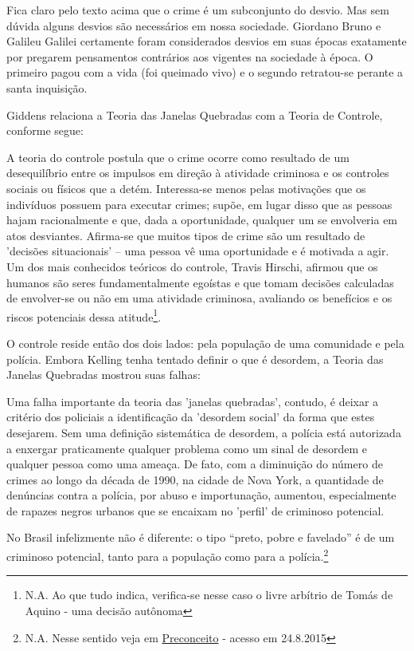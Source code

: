\documentclass[
	12pt,				%
	openright,			%
	twoside,			%
	a4paper,			%
	chapter=TITLE,		%
	section=TITLE,		%
	subsection=TITLE,	%
	subsubsection=TITLE,%
	spanish,            %
	english,			%
	brazil				%
	]{abntex2}
\begin{document}
\par
Fica claro pelo texto acima que o crime é um subconjunto do desvio. Mas sem dúvida alguns desvios são necessários em nossa sociedade. Giordano Bruno e Galileu Galilei certamente foram considerados desvios em suas épocas exatamente por pregarem pensamentos contrários aos vigentes na sociedade à época. O primeiro pagou com a vida (foi queimado vivo) e o segundo retratou-se perante a santa inquisição.
\par
Giddens relaciona a Teoria das Janelas Quebradas com a Teoria de Controle, conforme segue:
\begin{citacao}
	A teoria do controle postula que o crime ocorre como resultado de um desequilíbrio entre os impulsos  em direção à atividade criminosa e os controles sociais ou físicos que a detém. Interessa-se menos pelas motivações  que os indivíduos possuem para executar crimes; supõe, em lugar disso que as pessoas hajam racionalmente e que, dada a oportunidade, qualquer um se envolveria em atos desviantes. Afirma-se que muitos tipos de crime são um resultado de 'decisões situacionais' -- uma pessoa vê uma oportunidade e é motivada a agir.\\
	Um dos mais conhecidos teóricos do controle, Travis Hirschi, afirmou que os humanos são seres fundamentalmente egoístas e que tomam decisões calculadas de envolver-se ou não em uma atividade criminosa, avaliando os benefícios e os riscos potenciais dessa atitude\footnote{N.A. Ao que tudo indica, verifica-se nesse caso o livre arbítrio de Tomás de Aquino - uma decisão autônoma}.\cite[p. ~180]{Giddens}
\end{citacao}
\par
O controle reside então dos dois lados: pela população de uma comunidade e pela polícia. Embora Kelling tenha tentado definir o que é
desordem, a Teoria das Janelas Quebradas mostrou suas falhas:
\begin{citacao}
	Uma falha importante da teoria das 'janelas quebradas', contudo, é deixar a critério dos policiais a identificação da 'desordem social' da forma que estes desejarem. Sem uma definição sistemática de desordem, a polícia está autorizada a enxergar praticamente qualquer problema como um sinal de desordem e qualquer pessoa como uma ameaça. De fato, com a diminuição do número de crimes ao longo da década de 1990, na cidade de Nova York, a quantidade de denúncias contra a polícia, por abuso e importunação, aumentou, especialmente de rapazes negros urbanos que se encaixam no 'perfil' de criminoso potencial.\cite[p. ~181]{Giddens}
\end{citacao}
\par
No Brasil infelizmente não é diferente: o tipo “preto, pobre e favelado” é de um criminoso potencial, tanto para a população como para a polícia.\footnote{N.A. Nesse sentido veja em \href{http://cartamaior.com.br/?/Editoria/Direitos-Humanos/A-receita-para-trazer-seguranca-a-praia-vetar-os-pretos-/5/34332}{Preconceito} - acesso em 24.8.2015}
\end{document}
